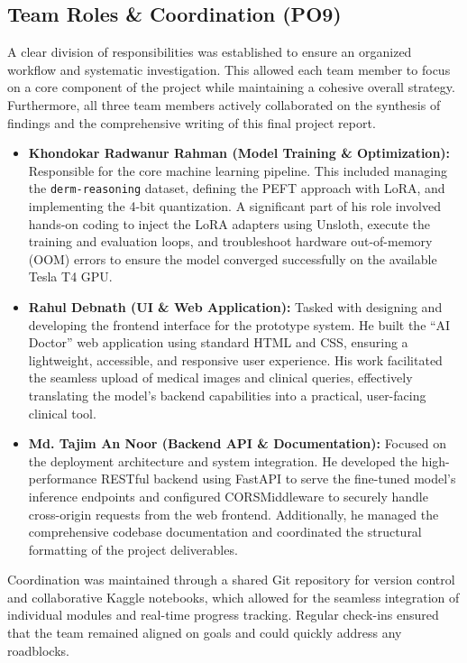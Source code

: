 \documentclass[11pt]{article}
\begin{document}
\subsection{Team Roles \& Coordination (PO9)}
A clear division of responsibilities was established to ensure an organized workflow and systematic investigation. This allowed each team member to focus on a core component of the project while maintaining a cohesive overall strategy. Furthermore, all three team members actively collaborated on the synthesis of findings and the comprehensive writing of this final project report.
\begin{itemize}
    \item \textbf{Khondokar Radwanur Rahman (Model Training \& Optimization):} Responsible for the core machine learning pipeline. This included managing the \texttt{derm-reasoning} dataset, defining the PEFT approach with LoRA, and implementing the 4-bit quantization. A significant part of his role involved hands-on coding to inject the LoRA adapters using Unsloth, execute the training and evaluation loops, and troubleshoot hardware out-of-memory (OOM) errors to ensure the model converged successfully on the available Tesla T4 GPU.
    \item \textbf{Rahul Debnath (UI \& Web Application):} Tasked with designing and developing the frontend interface for the prototype system. He built the ``AI Doctor'' web application using standard HTML and CSS, ensuring a lightweight, accessible, and responsive user experience. His work facilitated the seamless upload of medical images and clinical queries, effectively translating the model's backend capabilities into a practical, user-facing clinical tool.
    \item \textbf{Md. Tajim An Noor (Backend API \& Documentation):} Focused on the deployment architecture and system integration. He developed the high-performance RESTful backend using FastAPI to serve the fine-tuned model's inference endpoints and configured CORSMiddleware to securely handle cross-origin requests from the web frontend. Additionally, he managed the comprehensive codebase documentation and coordinated the structural formatting of the project deliverables.
\end{itemize}
Coordination was maintained through a shared Git repository for version control and collaborative Kaggle notebooks, which allowed for the seamless integration of individual modules and real-time progress tracking. Regular check-ins ensured that the team remained aligned on goals and could quickly address any roadblocks.
\end{document}

